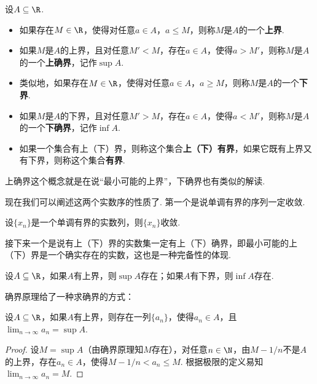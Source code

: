 \begin{definition}
    设$A\subseteq\R$. 
\begin{itemize}
    \item 如果存在$M\in\R$，使得对任意$a\in A$，$a\leq M$，则称$M$是$A$的一个\textbf{上界}. 
    \item 如果$M$是$A$的上界，且对任意$M'<M$，存在$a\in A$，使得$a>M'$，则称$M$是$A$的一个\textbf{上确界}，记作$\sup A$. 
    \item  类似地，如果存在$M\in\R$，使得对任意$a\in A$，$a\geq M$，则称$M$是$A$的一个\textbf{下界}. 
    \item 如果$M$是$A$的下界，且对任意$M'>M$，存在$a\in A$，使得$a<M'$，则称$M$是$A$的一个\textbf{下确界}，记作$\inf A$. 
    \item     如果一个集合有上（下）界，则称这个集合\textbf{上（下）有界}，如果它既有上界又有下界，则称这个集合\textbf{有界}. 
\end{itemize}    
\end{definition}

上确界这个概念就是在说“最小可能的上界”，下确界也有类似的解读. 

现在我们可以阐述这两个实数序的性质了. 第一个是说单调有界的序列一定收敛. 

\begin{proposition}[单调有界原理]\label{prop:monotone-bounded}
    设$\{x_n\}$是一个单调有界的实数列，则$\{x_n\}$收敛. 
\end{proposition}

接下来一个是说有上（下）界的实数集一定有上（下）确界，即最小可能的上（下）界是一个确实存在的实数，这也是一种完备性的体现. 
\begin{proposition}[确界原理]\label{prop:supremum}
    设$A\subseteq\R$，如果$A$有上界，则$\sup A$存在；如果$A$有下界，则$\inf A$存在. 
\end{proposition}

确界原理给了一种求确界的方式：
\begin{proposition}\label{prop:supremum-epsilon}
    设$A\subseteq\R$，如果$A$有上界，则存在一列$\{a_n\}$，使得$a_n\in A$，且$\lim_{n\to\infty}a_n=\sup A$.
\end{proposition}
\begin{proof}
    设$M=\sup A$（由确界原理知$M$存在），对任意$n\in\N$，由$M-1/n$不是$A$的上界，存在$a_n\in A$，使得$M-1/n<a_n\leq M$. 根据极限的定义易知$\lim_{n\to\infty}a_n=M$.
\end{proof}


